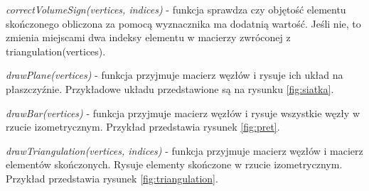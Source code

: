 \textit{correctVolumeSign(vertices, indices)} - funkcja sprawdza czy objętość elementu skończonego obliczona za pomocą wyznacznika ma dodatnią wartość. Jeśli nie, to zmienia miejscami dwa indeksy elementu w macierzy zwróconej z triangulation(vertices).

\textit{drawPlane(vertices)} - funkcja przyjmuje macierz węzłów i rysuje ich układ na płaszczyźnie. Przykładowe układu przedstawione są na rysunku \ref{fig:siatka}.

\textit{drawBar(vertices)} - funkcja przyjmuje macierz węzłów i rysuje wszystkie węzły w rzucie izometrycznym. Przykład przedstawia rysunek \ref{fig:pret}.

\textit{drawTriangulation(vertices, indices)} - funkcja przyjmuje macierz węzłów i macierz elementów skończonych. Rysuje elementy skończone w rzucie izometrycznym. Przykład przedstawia rysunek \ref{fig:triangulation}.

